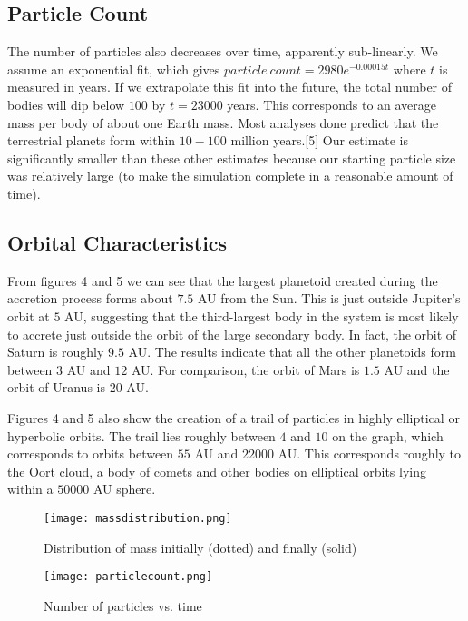 \documentclass{article}
\begin{document}
\subsection{Particle Count}
The number of particles also decreases over time, apparently sub-linearly. We assume an exponential fit, which gives $particle\ count = 2980e^{-0.00015t}$ where $t$ is measured in years. If we extrapolate this fit into the future, the total number of bodies will dip below $100$ by $t = 23000$ years. This corresponds to an average mass per body of about one Earth mass. Most analyses done predict that the terrestrial planets form within $10-100$ million years.[5] Our estimate is significantly smaller than these other estimates because our starting particle size was relatively large (to make the simulation complete in a reasonable amount of time).

\subsection{Orbital Characteristics}
From figures 4 and 5 we can see that the largest planetoid created during the accretion process forms about $7.5$ AU from the Sun. This is just outside Jupiter's orbit at $5$ AU, suggesting that the third-largest body in the system is most likely to accrete just outside the orbit of the large secondary body. In fact, the orbit of Saturn is roughly $9.5$ AU. The results indicate that all the other planetoids form between $3$ AU and $12$ AU. For comparison, the orbit of Mars is $1.5$ AU and the orbit of Uranus is $20$ AU.

Figures 4 and 5 also show the creation of a trail of particles in highly elliptical or hyperbolic orbits. The trail lies roughly between $4$ and $10$ on the graph, which corresponds to orbits between $55$ AU and $22000$ AU. This corresponds roughly to the Oort cloud, a body of comets and other bodies on elliptical orbits lying within a $50000$ AU sphere.

\begin{figure} 
 \begin{center}
 \texttt{[image: massdistribution.png]} 
 \caption{Distribution of mass initially (dotted) and finally (solid)}
 \end{center}
\end{figure}

\begin{figure} 
 \begin{center}
 \texttt{[image: particlecount.png]} 
 \caption{Number of particles vs. time}
 \end{center}
\end{figure}
\end{document}
